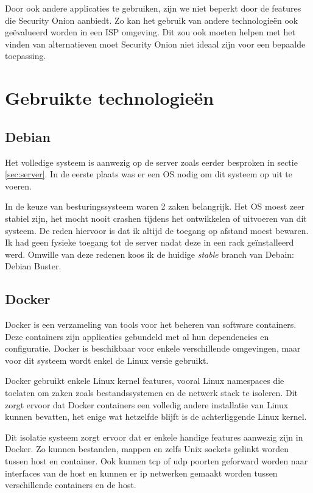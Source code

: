 \documentclass[a4paper,12pt]{report}
\begin{document}
Door ook andere applicaties te gebruiken, zijn we niet beperkt door de features die Security Onion aanbiedt.
Zo kan het gebruik van andere technologieën ook geëvalueerd worden in een ISP omgeving.
Dit zou ook moeten helpen met het vinden van alternatieven moet Security Onion niet ideaal zijn voor een bepaalde toepassing.

\section{Gebruikte technologie\"en}
\subsection{Debian}
Het volledige systeem is aanwezig op de server zoals eerder besproken in sectie \ref{sec:server}.
In de eerste plaats was er een OS nodig om dit systeem op uit te voeren.

In de keuze van besturingssysteem waren 2 zaken belangrijk.
Het OS moest zeer stabiel zijn, het mocht nooit crashen tijdens het ontwikkelen of uitvoeren van dit systeem.
De reden hiervoor is dat ik altijd de toegang op afstand moest bewaren.
Ik had geen fysieke toegang tot de server nadat deze in een rack geïnstalleerd werd.
Omwille van deze redenen koos ik de huidige \emph{stable} branch van Debain: Debian Buster.

\subsection{Docker}
Docker is een verzameling van tools voor het beheren van software containers.
Deze containers zijn applicaties gebundeld met al hun dependencies en configuratie.
Docker is beschikbaar voor enkele verschillende omgevingen, maar voor dit systeem wordt enkel de Linux versie gebruikt.

Docker gebruikt enkele Linux kernel features, vooral Linux namespaces die toelaten om zaken zoals bestandssystemen en de netwerk stack te isoleren.
Dit zorgt ervoor dat Docker containers een volledig andere installatie van Linux kunnen bevatten, het enige wat hetzelfde blijft is de achterliggende Linux kernel.

Dit isolatie systeem zorgt ervoor dat er enkele handige features aanwezig zijn in Docker.
Zo kunnen bestanden, mappen en zelfs Unix sockets gelinkt worden tussen host en container.
Ook kunnen tcp of udp poorten geforward worden naar interfaces van de host en kunnen er ip netwerken gemaakt worden tussen verschillende containers en de host.
\end{document}
